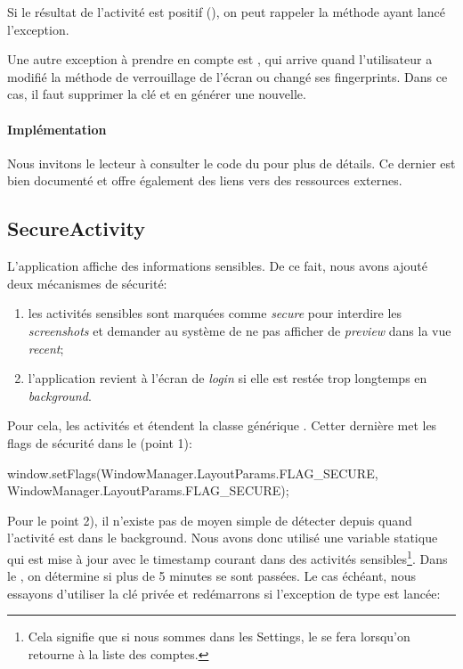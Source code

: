 Si le résultat de l'activité est positif (), on peut rappeler la méthode ayant lancé l'exception.

Une autre exception à prendre en compte est , qui arrive quand l'utilisateur a modifié la méthode de verrouillage de l'écran ou changé ses fingerprints. Dans ce cas, il faut supprimer la clé et en générer une nouvelle.

\paragraph*{Implémentation} Nous invitons le lecteur à consulter le code du  pour plus de détails. Ce dernier est bien documenté et offre également des liens vers des ressources externes.

\subsection{SecureActivity}

L'application affiche des informations sensibles. De ce fait, nous avons ajouté deux mécanismes de sécurité:
\begin{enumerate}
    \item les activités sensibles sont marquées comme \emph{secure} pour interdire les \emph{screenshots} et demander au système de ne pas afficher de \emph{preview} dans la vue \emph{recent};
    \item l'application revient à l'écran de \emph{login} si elle est restée trop longtemps en \emph{background}.
\end{enumerate}


Pour cela, les activités  et  étendent la classe générique . Cetter dernière met les flags de sécurité dans le  (point 1):

\begin{kotlincode}
window.setFlags(WindowManager.LayoutParams.FLAG_SECURE,
    WindowManager.LayoutParams.FLAG_SECURE);
\end{kotlincode}

Pour le point 2), il n'existe pas de moyen simple de détecter depuis quand l'activité est dans le background. Nous avons donc utilisé une variable statique qui est mise à jour avec le timestamp courant dans  des activités sensibles\footnote{Cela signifie que si nous sommes dans les Settings, le  se fera lorsqu'on retourne à la liste des comptes.}. Dans le , on détermine si plus de 5 minutes se sont passées. Le cas échéant, nous essayons d'utiliser la clé privée et redémarrons si l'exception de type  est lancée:


